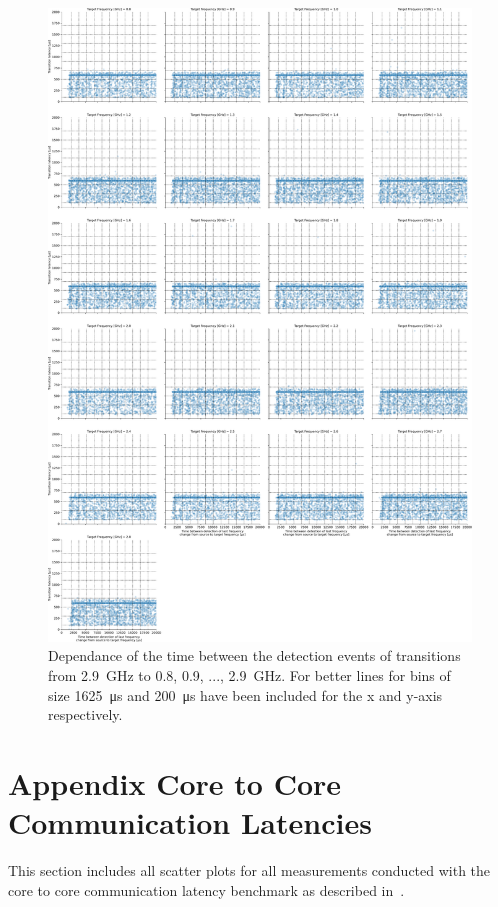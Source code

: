 \begin{figure}[]
    \centering
    \includegraphics[width=\columnwidth]{fig/ftalat_scatter_wait_transition_latency_hati_source_2.9.pdf}
    \caption{Dependance of the time between the detection events of transitions from \SI{2.9}{\GHz} to \SI{0.8}{}, \SI{0.9}{}, ..., \SI{2.9}{\GHz}. For better lines for bins of size \SI{1625}{\us} and \SI{200}{\us} have been included for the x and y-axis respectively.}
\end{figure}

\chapter{Appendix Core to Core Communication Latencies}
\label{app:core_to_core_latencies_complete}
This section includes all scatter plots for all measurements conducted with the core to core communication latency benchmark as described in~.

